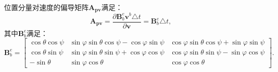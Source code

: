 位置分量对速度的偏导矩阵$\boldsymbol{A}_{\boldsymbol{pv}}$满足：
\begin{equation}
    \boldsymbol{A}_{\boldsymbol{pv}} = \frac{\partial \boldsymbol{B}_b^e \boldsymbol{v}^b \triangle t}{\partial \boldsymbol{v}} = \boldsymbol{B}_b^e \triangle t ,
\end{equation}
其中$\boldsymbol{B}_b^e$满足：
\begin{equation}
    \boldsymbol{B}_b^e = \begin{bmatrix}
        \cos\theta\cos\psi & \sin\varphi\sin\theta\cos\psi - \cos\varphi\sin\psi & \cos\varphi\sin\theta\cos\psi + \sin\varphi\sin\psi \\
        \cos\theta\sin\psi & \sin\varphi\sin\theta\sin\psi + \cos\varphi\cos\psi & \cos\varphi\sin\theta\sin\psi - \sin\varphi\cos\psi \\
        -\sin\theta & \sin\varphi\cos\theta & \cos\varphi\cos\theta
    \end{bmatrix}.
\end{equation}

